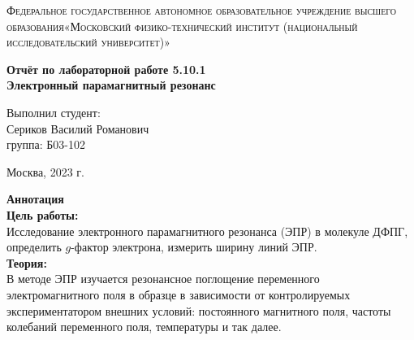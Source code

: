 \documentclass[a4paper, 12pt]{article}%
\begin{document}
	\begin{titlepage}
		\begin{center}
			\textsc{Федеральное государственное автономное образовательное учреждение высшего образования«Московский физико-технический институт (национальный исследовательский университет)»\\[5mm]
			}
			
			\vfill
			
			\textbf{Отчёт по лабораторной работе 5.10.1\\[3mm]
				Электронный парамагнитный резонанс
				\\[50mm]
			}
			
		\end{center}
		
		\hfill
		\begin{minipage}{.5\textwidth}
			Выполнил студент:\\[2mm]
			Сериков Василий Романович\\[2mm]
			группа: Б03-102\\[5mm]
			
		\end{minipage}
		\vfill
		\begin{center}
			Москва, 2023 г.
		\end{center}
		
	\end{titlepage}
	
	\newpage
	\setcounter{page}{2}
	\textbf{Аннотация}\\
	
	\textbf{Цель работы: }\\
	
	 Исследование электронного парамагнитного резонанса (ЭПР) в молекуле ДФПГ, определить $g$-фактор электрона, измерить ширину линий ЭПР.\\
	
	\textbf{Теория: }\\
	
	В методе ЭПР изучается резонансное поглощение переменного электромагнитного поля в
	образце в зависимости от контролируемых экспериментатором внешних условий:
	постоянного магнитного поля, частоты колебаний переменного поля, температуры и так
	далее.
	
\end{document}
